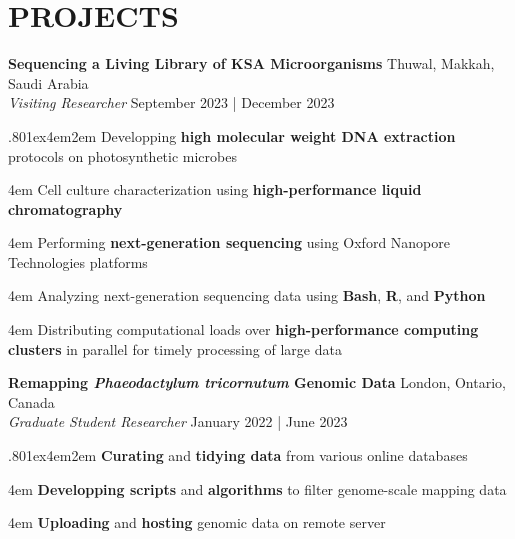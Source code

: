 \documentclass[a4paper,9pt]{extarticle}
\begin{document}
\section*{PROJECTS}
\noindent
\begin{minipage}{1\textwidth}
\setlength{\parindent}{15pt} %
	\noindent
	\textbf{Sequencing a Living Library of KSA Microorganisms} \hfill Thuwal, Makkah, Saudi Arabia\\ %
	\textit{Visiting Researcher}
	\hfill September 2023 | December 2023 \par%
	{\hsize.80\linewidth\parskip1ex\hangindent4em\parindent2em 
	\setlength{\parskip}{0pt} %
		Developping \textbf{high molecular weight DNA extraction} protocols on photosynthetic microbes\par
		\hangindent4em
		Cell culture characterization using \textbf{high-performance liquid chromatography}\par		
		\hangindent4em
		Performing \textbf{next-generation sequencing} using Oxford Nanopore Technologies platforms\par
		\hangindent4em
		Analyzing next-generation sequencing data using \textbf{Bash}, \textbf{R}, and \textbf{Python}\par
		\hangindent4em
		Distributing computational loads over \textbf{high-performance computing clusters} in parallel for timely processing of large data\par}
\end{minipage}
\vspace{\parskip}

\noindent
\begin{minipage}{1\textwidth}
\setlength{\parindent}{15pt} %
	\noindent
	\textbf{Remapping \textit{Phaeodactylum tricornutum} Genomic Data} \hfill London, Ontario, Canada\\ %
	\textit{Graduate Student Researcher}
	\hfill January 2022 | June 2023 \par %
	{\hsize.80\linewidth\parskip1ex\hangindent4em\parindent2em 
	\setlength{\parskip}{0pt} %
		\textbf{Curating} and \textbf{tidying data} from various online databases\par
		\hangindent4em
		\textbf{Developping scripts} and \textbf{algorithms} to filter genome-scale mapping data \par
		\hangindent4em
		\textbf{Uploading} and \textbf{hosting} genomic data on remote server\par}
\end{minipage}
\vspace{\parskip}
\end{document}

